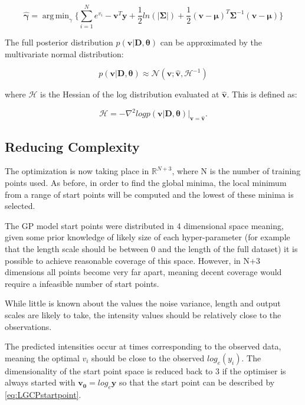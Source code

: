 \documentclass[a4paper,11pt]{report}
\DeclareMathOperator*{\argmin}{arg\,min}
\begin{document}
\begin{equation} \label{eq:GPfmin}
\hat{\boldsymbol{\gamma}} = \argmin_\gamma{\{ \sum_{i=1}^{N}e^{v_i} - \mathbf{v}^{T}\mathbf{y} + \frac{1}{2}ln(|\boldsymbol{\Sigma}|) + \frac{1}{2}(\mathbf{v}-\boldsymbol{\mu})^{T}\boldsymbol{\Sigma}^{-1}(\mathbf{v}-\boldsymbol{\mu})\}}
\end{equation}

The full posterior distribution \(p(\mathbf{v|D},\boldsymbol{\theta})\) can be approximated by the multivariate normal distribution:

\begin{equation} \label{eq:LGCPapproxpost}
p(\mathbf{v|D},\boldsymbol{\theta}) \approx \mathcal{N} (\mathbf{v}; \hat{\mathbf{v}}, \boldsymbol{\mathcal{H}}^{-1})
\end{equation}

where \(\boldsymbol{\mathcal{H}}\) is the Hessian of the log distribution evaluated at \(\hat{\mathbf{v}}\). This is defined as:

\begin{equation}
\boldsymbol{\mathcal{H}} = -\nabla^2 log p(\mathbf{v|D},\boldsymbol{\theta}) |_{\mathbf{v}=\hat{\mathbf{v}}}.
\end{equation}

\subsection{Reducing Complexity}

The optimization is now taking place in \(\mathds{R}^{N+3}\), where N is the number of training points used. As before, in order to find the global minima, the local minimum from a range of start points will be computed and the lowest of these minima is selected.

The GP model start points were distributed in 4 dimensional space meaning, given some prior knowledge of likely size of each hyper-parameter (for example that the length scale should be between 0 and the length of the full dataset) it is possible to achieve reasonable coverage of this space. However, in N+3 dimensions all points become very far apart, meaning decent coverage would require a infeasible number of start points.

While little is known about the values the noise variance, length and output scales are likely to take, the intensity values should be relatively close to the observations. 

The predicted intensities occur at times corresponding to the observed data, meaning the optimal \(v_i\) should be close to the observed \(log_e(y_i)\). The dimensionality of the start point space is reduced back to 3 if the optimiser is always started with \(\mathbf{v_0} = log_e \mathbf{y}\) so that the start point can be described by \ref{eq:LGCPstartpoint}. 
\end{document}
